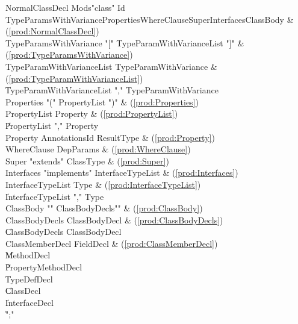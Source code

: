 \begin{bbgrammar}
     NormalClassDecl \: Mods\opt \xcd"class" Id TypeParamsWithVariance\opt Properties\opt WhereClause\opt Super\opt Interfaces\opt ClassBody & (\ref{prod:NormalClassDecl}) \\
TypeParamsWithVariance \: \xcd"[" TypeParamWithVarianceList \xcd"]" & (\ref{prod:TypeParamsWithVariance}) \\
TypeParamWithVarianceList \: TypeParamWithVariance & (\ref{prod:TypeParamWithVarianceList}) \\
                    \| TypeParamWithVarianceList \xcd"," TypeParamWithVariance \\
          Properties \: \xcd"(" PropertyList \xcd")" & (\ref{prod:Properties}) \\
        PropertyList \: Property & (\ref{prod:PropertyList}) \\
                    \| PropertyList \xcd"," Property \\
            Property \: Annotations\opt Id ResultType & (\ref{prod:Property}) \\
         WhereClause \: DepParams & (\ref{prod:WhereClause}) \\
               Super \: \xcd"extends" ClassType & (\ref{prod:Super}) \\
          Interfaces \: \xcd"implements" InterfaceTypeList & (\ref{prod:Interfaces}) \\
   InterfaceTypeList \: Type & (\ref{prod:InterfaceTypeList}) \\
                    \| InterfaceTypeList \xcd"," Type \\
           ClassBody \: \xcd"{" ClassBodyDecls\opt \xcd"}" & (\ref{prod:ClassBody}) \\
      ClassBodyDecls \: ClassBodyDecl & (\ref{prod:ClassBodyDecls}) \\
                    \| ClassBodyDecls ClassBodyDecl \\
     ClassMemberDecl \: FieldDecl & (\ref{prod:ClassMemberDecl}) \\
                    \| MethodDecl \\
                    \| PropertyMethodDecl \\
                    \| TypeDefDecl \\
                    \| ClassDecl \\
                    \| InterfaceDecl \\
                    \| \xcd";" \\
\end{bbgrammar}




